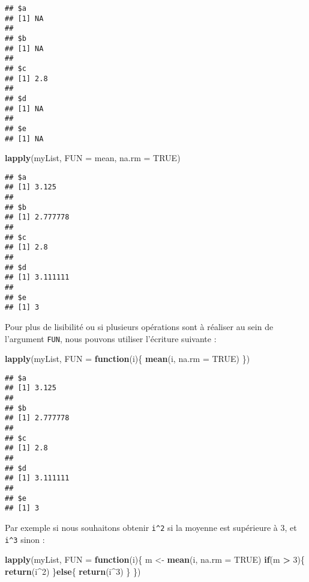 \documentclass[]{book}
\newenvironment{Shaded}{\begin{snugshade}}{\end{snugshade}}
\newcommand{\KeywordTok}[1]{\textcolor[rgb]{0.13,0.29,0.53}{\textbf{#1}}}
\newcommand{\DataTypeTok}[1]{\textcolor[rgb]{0.13,0.29,0.53}{#1}}
\newcommand{\DecValTok}[1]{\textcolor[rgb]{0.00,0.00,0.81}{#1}}
\newcommand{\StringTok}[1]{\textcolor[rgb]{0.31,0.60,0.02}{#1}}
\newcommand{\OtherTok}[1]{\textcolor[rgb]{0.56,0.35,0.01}{#1}}
\newcommand{\ControlFlowTok}[1]{\textcolor[rgb]{0.13,0.29,0.53}{\textbf{#1}}}
\newcommand{\OperatorTok}[1]{\textcolor[rgb]{0.81,0.36,0.00}{\textbf{#1}}}
\newcommand{\NormalTok}[1]{#1}
\theoremstyle{definition}
\theoremstyle{definition}
\theoremstyle{definition}
\theoremstyle{remark}
\begin{document}
\begin{verbatim}
## $a
## [1] NA
## 
## $b
## [1] NA
## 
## $c
## [1] 2.8
## 
## $d
## [1] NA
## 
## $e
## [1] NA
\end{verbatim}

\begin{Shaded}
\begin{Highlighting}[]
\KeywordTok{lapply}\NormalTok{(myList, }\DataTypeTok{FUN =}\NormalTok{ mean, }\DataTypeTok{na.rm =} \OtherTok{TRUE}\NormalTok{)}
\end{Highlighting}
\end{Shaded}

\begin{verbatim}
## $a
## [1] 3.125
## 
## $b
## [1] 2.777778
## 
## $c
## [1] 2.8
## 
## $d
## [1] 3.111111
## 
## $e
## [1] 3
\end{verbatim}

Pour plus de lisibilité ou si plusieurs opérations sont à réaliser au
sein de l'argument \texttt{FUN}, nous pouvons utiliser l'écriture
suivante :

\begin{Shaded}
\begin{Highlighting}[]
\KeywordTok{lapply}\NormalTok{(myList, }\DataTypeTok{FUN =} \ControlFlowTok{function}\NormalTok{(i)\{}
  \KeywordTok{mean}\NormalTok{(i, }\DataTypeTok{na.rm =} \OtherTok{TRUE}\NormalTok{)}
\NormalTok{\})}
\end{Highlighting}
\end{Shaded}

\begin{verbatim}
## $a
## [1] 3.125
## 
## $b
## [1] 2.777778
## 
## $c
## [1] 2.8
## 
## $d
## [1] 3.111111
## 
## $e
## [1] 3
\end{verbatim}

Par exemple si nous souhaitons obtenir \texttt{i\^{}2} si la moyenne est
supérieure à 3, et \texttt{i\^{}3} sinon :

\begin{Shaded}
\begin{Highlighting}[]
\KeywordTok{lapply}\NormalTok{(myList, }\DataTypeTok{FUN =} \ControlFlowTok{function}\NormalTok{(i)\{}
\NormalTok{  m <-}\StringTok{ }\KeywordTok{mean}\NormalTok{(i, }\DataTypeTok{na.rm =} \OtherTok{TRUE}\NormalTok{)}
  \ControlFlowTok{if}\NormalTok{(m }\OperatorTok{>}\StringTok{ }\DecValTok{3}\NormalTok{)\{}
    \KeywordTok{return}\NormalTok{(i}\OperatorTok{^}\DecValTok{2}\NormalTok{)  }
\NormalTok{  \}}\ControlFlowTok{else}\NormalTok{\{}
    \KeywordTok{return}\NormalTok{(i}\OperatorTok{^}\DecValTok{3}\NormalTok{)}
\NormalTok{  \}}
\NormalTok{\})}
\end{Highlighting}
\end{Shaded}
\end{document}

